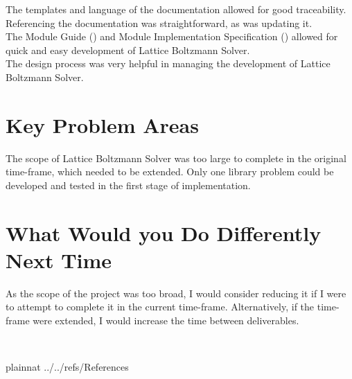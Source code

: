\documentclass{article}
\newcommand{\myprogname}{Lattice Boltzmann Solver}
\begin{document}
The templates and language of the documentation allowed for good traceability. Referencing the documentation was straightforward, as was updating it.\\

\noindent The Module Guide (\citet{LBM_MG_PM}) and Module Implementation Specification (\citet{LBM_MIS_PM}) allowed for quick and easy development of {\myprogname}.\\

\noindent The design process was very helpful in managing the development of {\myprogname}.

\section{Key Problem Areas}

\noindent The scope of {\myprogname} was too large to complete in the original time-frame, which needed to be extended. Only one library problem could be developed and tested in the first stage of implementation.

\section{What Would you Do Differently Next Time}

\noindent As the scope of the project was too broad, I would consider reducing it if I were to attempt to complete it in the current time-frame. Alternatively, if the time-frame were extended, I would increase the time  between deliverables. 

~\newpage

 {plainnat}
 {../../refs/References}
\end{document}
